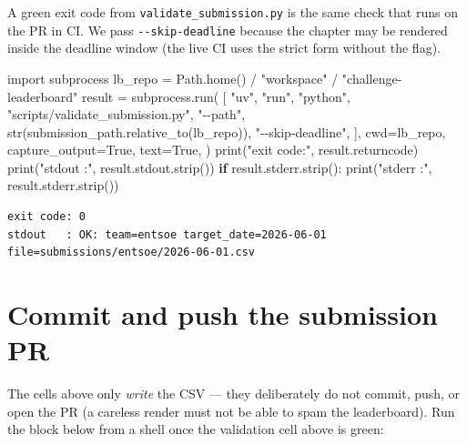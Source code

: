 \documentclass[
  english,
  letterpaper,
]{scrbook}
\newenvironment{Shaded}{\begin{snugshade}}{\end{snugshade}}
\newcommand{\BuiltInTok}[1]{\textcolor[rgb]{0.00,0.23,0.31}{#1}}
\newcommand{\ControlFlowTok}[1]{\textcolor[rgb]{0.00,0.23,0.31}{\textbf{#1}}}
\newcommand{\ImportTok}[1]{\textcolor[rgb]{0.00,0.46,0.62}{#1}}
\newcommand{\NormalTok}[1]{\textcolor[rgb]{0.00,0.23,0.31}{#1}}
\newcommand{\OperatorTok}[1]{\textcolor[rgb]{0.37,0.37,0.37}{#1}}
\newcommand{\StringTok}[1]{\textcolor[rgb]{0.13,0.47,0.30}{#1}}
\newcommand{\VariableTok}[1]{\textcolor[rgb]{0.07,0.07,0.07}{#1}}
\begin{document}
A green exit code from \texttt{validate\_submission.py} is the same
check that runs on the PR in CI. We pass \texttt{-\/-skip-deadline}
because the chapter may be rendered inside the deadline window (the live
CI uses the strict form without the flag).

\protect{}\label{entsoe-validate}
\begin{Shaded}
\begin{Highlighting}[]
\ImportTok{import}\NormalTok{ subprocess}
\NormalTok{lb\_repo }\OperatorTok{=}\NormalTok{ Path.home() }\OperatorTok{/} \StringTok{"workspace"} \OperatorTok{/} \StringTok{"challenge{-}leaderboard"}
\NormalTok{result }\OperatorTok{=}\NormalTok{ subprocess.run(}
\NormalTok{    [}
        \StringTok{"uv"}\NormalTok{, }\StringTok{"run"}\NormalTok{, }\StringTok{"python"}\NormalTok{, }\StringTok{"scripts/validate\_submission.py"}\NormalTok{,}
        \StringTok{"{-}{-}path"}\NormalTok{, }\BuiltInTok{str}\NormalTok{(submission\_path.relative\_to(lb\_repo)),}
        \StringTok{"{-}{-}skip{-}deadline"}\NormalTok{,}
\NormalTok{    ],}
\NormalTok{    cwd}\OperatorTok{=}\NormalTok{lb\_repo,}
\NormalTok{    capture\_output}\OperatorTok{=}\VariableTok{True}\NormalTok{,}
\NormalTok{    text}\OperatorTok{=}\VariableTok{True}\NormalTok{,}
\NormalTok{)}
\BuiltInTok{print}\NormalTok{(}\StringTok{"exit code:"}\NormalTok{, result.returncode)}
\BuiltInTok{print}\NormalTok{(}\StringTok{"stdout   :"}\NormalTok{, result.stdout.strip())}
\ControlFlowTok{if}\NormalTok{ result.stderr.strip():}
    \BuiltInTok{print}\NormalTok{(}\StringTok{"stderr   :"}\NormalTok{, result.stderr.strip())}
\end{Highlighting}
\end{Shaded}

\begin{verbatim}
exit code: 0
stdout   : OK: team=entsoe target_date=2026-06-01 file=submissions/entsoe/2026-06-01.csv
\end{verbatim}

\section{Commit and push the submission PR}\label{sec-entsoe-push}

The cells above only \emph{write} the CSV --- they deliberately do not
commit, push, or open the PR (a careless render must not be able to spam
the leaderboard). Run the block below from a shell once the validation
cell above is green:
\end{document}
